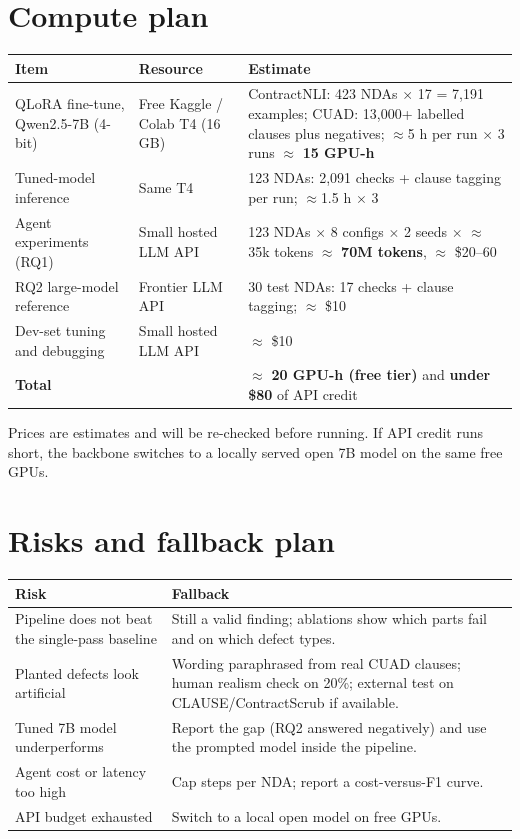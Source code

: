 \documentclass[11pt,a4paper]{article}
\begin{document}
\section{Compute plan}
\begin{table}[H]
\small
\begin{tabularx}{\textwidth}{@{}p{4.2cm}p{4.3cm}L@{}}
\toprule
\textbf{Item} & \textbf{Resource} & \textbf{Estimate} \\
\midrule
QLoRA fine-tune, Qwen2.5-7B (4-bit) & Free Kaggle / Colab T4 (16 GB) & ContractNLI: 423 NDAs $\times$ 17 = 7{,}191 examples; CUAD: 13{,}000+ labelled clauses plus negatives; $\approx$5 h per run $\times$ 3 runs $\approx$ \textbf{15 GPU-h} \\
Tuned-model inference & Same T4 & 123 NDAs: 2{,}091 checks + clause tagging per run; $\approx$1.5 h $\times$ 3 \\
Agent experiments (RQ1) & Small hosted LLM API & 123 NDAs $\times$ 8 configs $\times$ 2 seeds $\times$ $\approx$35k tokens $\approx$ \textbf{70M tokens}, $\approx$ \$20--60 \\
RQ2 large-model reference & Frontier LLM API & 30 test NDAs: 17 checks + clause tagging; $\approx$ \$10 \\
Dev-set tuning and debugging & Small hosted LLM API & $\approx$ \$10 \\
\midrule
\textbf{Total} & & $\approx$ \textbf{20 GPU-h (free tier)} and \textbf{under \$80} of API credit \\
\bottomrule
\end{tabularx}
\end{table}
Prices are estimates and will be re-checked before running. If API credit runs short, the backbone switches to a locally
served open 7B model on the same free GPUs.

\section{Risks and fallback plan}
\begin{table}[H]
\small
\begin{tabularx}{\textwidth}{@{}p{5.6cm}L@{}}
\toprule
\textbf{Risk} & \textbf{Fallback} \\
\midrule
Pipeline does not beat the single-pass baseline & Still a valid finding; ablations show which parts fail and on which defect types. \\
Planted defects look artificial & Wording paraphrased from real CUAD clauses; human realism check on 20\%; external test on CLAUSE/ContractScrub if available. \\
Tuned 7B model underperforms & Report the gap (RQ2 answered negatively) and use the prompted model inside the pipeline. \\
Agent cost or latency too high & Cap steps per NDA; report a cost-versus-F1 curve. \\
API budget exhausted & Switch to a local open model on free GPUs. \\
\bottomrule
\end{tabularx}
\end{table}
\end{document}
